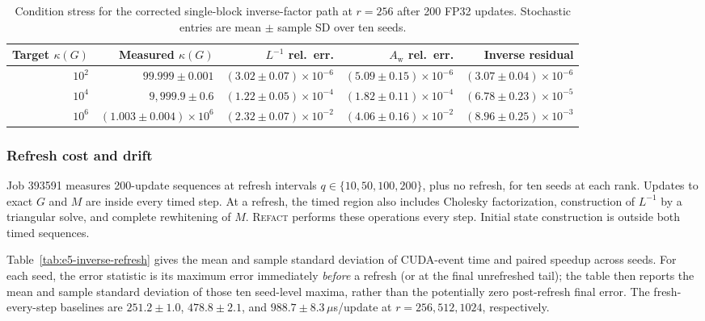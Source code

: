 \documentclass[11pt]{article}
\newcommand{\refact}{\textsc{Refact}}
\newcommand{\Aw}{A_{\mathrm w}}
\begin{document}
\begin{table}[ht]
\centering
\scriptsize
\caption{Condition stress for the corrected single-block inverse-factor path
at \(r=256\) after 200 FP32 updates.  Stochastic entries are mean \(\pm\)
sample SD over ten seeds.}
\label{tab:e5-inverse-condition}
{\setlength{\tabcolsep}{3pt}
\begin{tabular}{@{}rrrrr@{}}
\toprule
Target \(\kappa(G)\) & Measured \(\kappa(G)\) &
\(L^{-1}\) rel.\ err. & \(\Aw\) rel.\ err. & Inverse residual \\
\midrule
\(10^2\) & \(99.999\pm0.001\) &
  \((3.02\pm0.07)\times10^{-6}\) & \((5.09\pm0.15)\times10^{-6}\) &
  \((3.07\pm0.04)\times10^{-6}\) \\
\(10^4\) & \(9{,}999.9\pm0.6\) &
  \((1.22\pm0.05)\times10^{-4}\) & \((1.82\pm0.11)\times10^{-4}\) &
  \((6.78\pm0.23)\times10^{-5}\) \\
\(10^6\) & \((1.003\pm0.004)\times10^6\) &
  \((2.32\pm0.07)\times10^{-2}\) & \((4.06\pm0.16)\times10^{-2}\) &
  \((8.96\pm0.25)\times10^{-3}\) \\
\bottomrule
\end{tabular}
}
\end{table}

\subsubsection{Refresh cost and drift}

Job 393591 measures 200-update sequences at refresh intervals
\(q\in\{10,50,100,200\}\), plus no refresh, for ten seeds at each rank.
Updates to exact \(G\) and \(M\) are inside every timed step.  At a refresh,
the timed region also includes Cholesky factorization, construction of
\(L^{-1}\) by a triangular solve, and complete rewhitening of \(M\).
\refact{} performs these operations every step.  Initial state construction is
outside both timed sequences.

Table~\ref{tab:e5-inverse-refresh} gives the mean and sample standard
deviation of CUDA-event time and paired speedup across seeds.  For each seed,
the error statistic is its maximum error immediately \emph{before} a refresh
(or at the final unrefreshed tail); the table then reports the mean and sample
standard deviation of those ten seed-level maxima, rather than the potentially
zero post-refresh final error.  The fresh-every-step baselines are
\(251.2\pm1.0\), \(478.8\pm2.1\), and \(988.7\pm8.3\)\,\(\mu\)s/update at
\(r=256,512,1024\), respectively.
\end{document}
